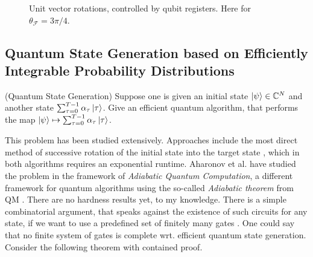 \begin{figure}[!hbtp]
    \centering
    \caption{Unit vector rotations, controlled by qubit registers. Here for \(\theta_{\mathcal{F}} = 3\pi/4\).}
    \label{cr_illustration}
\end{figure}

\subsection{Quantum State Generation based on Efficiently Integrable Probability Distributions } \label{quantum_state_generation_based_on_efficiently_integrable_probability_distributions}

\begin{problem}{(Quantum State Generation)}
    Suppose one is given an initial state \(\ket{\psi} \in \mathbb{C}^N\) and another state \(\sum_{\tau = 0}^{T-1} \alpha_\tau \ket{\tau}\). Give an efficient quantum algorithm, that performs the map \(\ket{\psi} \mapsto \sum_{\tau = 0}^{T-1} \alpha_\tau \ket{\tau}\).
\end{problem}

This problem has been studied extensively. Approaches include the most direct method of successive rotation of the initial state into the target state \cite{Kaye2004, Mottonen2004}, which in both algorithms requires an exponential runtime. Aharonov et al. \cite{Aharonov2003} have studied the problem in the framework of \emph{Adiabatic Quantum Computation}, a different framework for quantum algorithms using the so-called \emph{Adiabatic theorem} from QM \cite[p. 426 ff.]{Griffiths2018}. There are no hardness results yet, to my knowledge. There is a simple combinatorial argument, that speaks against the existence of such circuits for any state, if we want to use a predefined set of finitely many gates \cite[pp. 198-200]{Nielsen2010}. One could say that no finite system of gates is complete wrt. efficient quantum state generation. Consider the following theorem with contained proof.

